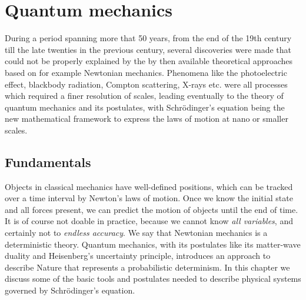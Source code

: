 \chapter{Quantum mechanics}
\label{ch:qm}
During a period spanning more that 50 years, from the end of the 19th century till the late twenties in the previous century, several discoveries were made that could not be properly explained by the by then available theoretical approaches based on for example Newtonian mechanics.
Phenomena like the photoelectric effect, blackbody radiation, Compton scattering, X-rays etc. were all processes which required a finer resolution of scales, leading eventually to the theory of quantum mechanics and its postulates, with Schr\"odinger's equation being the new mathematical framework to express the laws of motion at nano or smaller scales.  



\section{Fundamentals}
Objects in classical mechanics have well-defined positions, which can
be tracked over a time interval by Newton's laws of motion.
Once we know the initial state and all forces present, we can predict the
motion of objects until the end of time. 
It is of course not doable in practice, because we cannot know \textit{all variables}, and certainly not to \textit{endless accuracy}. 
We say that Newtonian mechanics is a deterministic theory.
Quantum mechanics, with its postulates like its matter-wave duality and Heisenberg's uncertainty principle, introduces an approach to describe Nature that represents a probabilistic determinism. 
In this chapter we discuss some of the basic tools and postulates needed to describe physical systems governed by Schr\"odinger's equation.


